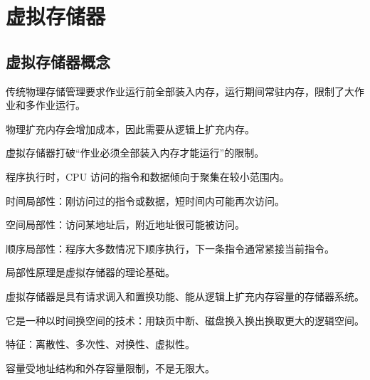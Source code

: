 \chapter{虚拟存储器}

\section{虚拟存储器概念}
\begin{points}
  \item 传统物理存储管理要求作业运行前全部装入内存，运行期间常驻内存，限制了大作业和多作业运行。
  \item 物理扩充内存会增加成本，因此需要从逻辑上扩充内存。
  \item 虚拟存储器打破“作业必须全部装入内存才能运行”的限制。
\end{points}


\begin{points}
  \item 程序执行时，CPU 访问的指令和数据倾向于聚集在较小范围内。
  \item 时间局部性：刚访问过的指令或数据，短时间内可能再次访问。
  \item 空间局部性：访问某地址后，附近地址很可能被访问。
  \item 顺序局部性：程序大多数情况下顺序执行，下一条指令通常紧接当前指令。
  \item 局部性原理是虚拟存储器的理论基础。
\end{points}


\begin{points}
  \item 虚拟存储器是具有请求调入和置换功能、能从逻辑上扩充内存容量的存储器系统。
  \item 它是一种以时间换空间的技术：用缺页中断、磁盘换入换出换取更大的逻辑空间。
  \item 特征：离散性、多次性、对换性、虚拟性。
  \item 容量受地址结构和外存容量限制，不是无限大。
\end{points}


